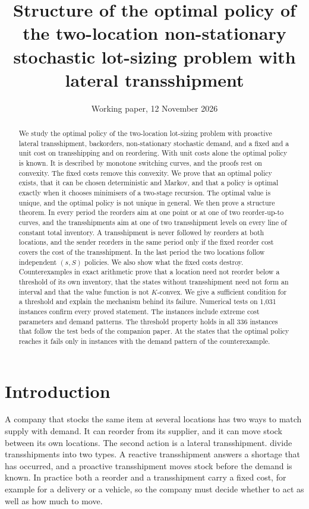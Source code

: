 \documentclass[11pt]{article}
\title{Structure of the optimal policy of the two-location non-stationary stochastic lot-sizing problem with lateral transshipment}
\author{Working paper, 12 November 2026}
\date{}
\theoremstyle{definition}
\begin{document}
\maketitle

\begin{abstract}
\noindent We study the optimal policy of the two-location lot-sizing problem with proactive lateral transshipment, backorders, non-stationary stochastic demand, and a fixed and a unit cost on transshipping and on reordering. With unit costs alone the optimal policy is known. It is described by monotone switching curves, and the proofs rest on convexity. The fixed costs remove this convexity. We prove that an optimal policy exists, that it can be chosen deterministic and Markov, and that a policy is optimal exactly when it chooses minimisers of a two-stage recursion. The optimal value is unique, and the optimal policy is not unique in general. We then prove a structure theorem. In every period the reorders aim at one point or at one of two reorder-up-to curves, and the transshipments aim at one of two transshipment levels on every line of constant total inventory. A transshipment is never followed by reorders at both locations, and the sender reorders in the same period only if the fixed reorder cost covers the cost of the transshipment. In the last period the two locations follow independent $(s,S)$ policies. We also show what the fixed costs destroy. Counterexamples in exact arithmetic prove that a location need not reorder below a threshold of its own inventory, that the states without transshipment need not form an interval and that the value function is not $K$-convex. We give a sufficient condition for a threshold and explain the mechanism behind its failure. Numerical tests on 1,031 instances confirm every proved statement. The instances include extreme cost parameters and demand patterns. The threshold property holds in all 336 instances that follow the test beds of the companion paper. At the states that the optimal policy reaches it fails only in instances with the demand pattern of the counterexample.
\end{abstract}

\section{Introduction}

A company that stocks the same item at several locations has two ways to match supply with demand. It can reorder from its supplier, and it can move stock between its own locations. The second action is a lateral transshipment. \citet{paterson2011inventory} divide transshipments into two types. A reactive transshipment answers a shortage that has occurred, and a proactive transshipment moves stock before the demand is known. In practice both a reorder and a transshipment carry a fixed cost, for example for a delivery or a vehicle, so the company must decide whether to act as well as how much to move.
\end{document}
